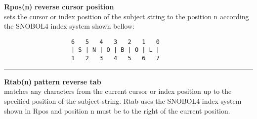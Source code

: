 \documentclass{article}
\begin{document}
\noindent\textbf{Rpos(n)} \hfill\textbf{reverse cursor position}\\
sets the cursor or index position of the subject string to the position n according the SNOBOL4 index system shown bellow:
\begin{verbatim}
                   6   5   4   3   2   1   0
                   | S | N | O | B | O | L |
                   1   2   3   4   5   6   7
\end{verbatim}
\noindent\rule{14cm}{0.1pt}

\noindent\textbf{Rtab(n)} \hfill\textbf{pattern reverse tab}\\
matches any characters from the current cursor or index position up to the specified position of the subject string. Rtab uses the SNOBOL4 index system shown in Rpos and position n must be to the right of the current position.\\


\newpage


\end{document}
